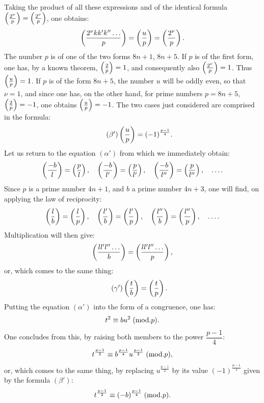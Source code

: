 \noindent
Taking the product of all these expressions and of the identical formula
$\left(\frac{2^\nu}{p}\right)=\left(\frac{2^\nu}{p}\right)$, one obtains:
\[
\left(\frac{2^\nu kk'k''\ldots}{p}\right)=\left(\frac{u}{p}\right)=\left(\frac{2^\nu}{p}\right).
\]
The number $p$ is of one of the two forms $8n+1$, $8n+5$. If $p$ is of the
first form, one has, by a known theorem, $\left(\frac{2}{p}\right)=1$, and consequently
also $\left(\frac{2^\nu}{p}\right)=1$. Thus $\left(\frac{u}{p}\right)=1$. If $p$ is of the form $8n+5$, the
number $u$ will be oddly even, so that $\nu=1$, and since one has, on the
other hand, for prime numbers $p=8n+5$, $\left(\frac{2}{p}\right)=-1$, one obtains
$\left(\frac{u}{p}\right)=-1$. The two cases just considered are comprised in
the formula:
\begin{equation*}\tag{$\beta'$}
\left(\frac{u}{p}\right)=(-1)^{\frac{p-1}{4}}.
\end{equation*}
Let us return to the equation $(\alpha')$ from which we immediately obtain:
\[
\left(\frac{-b}{l}\right)=\left(\frac{p}{l}\right),\quad\left(\frac{-b}{l'}\right)=\left(\frac{p}{l'}\right),\quad
\left(\frac{-b}{l''}\right)=\left(\frac{p}{l''}\right),\quad\ldots.
\]
Since $p$ is a prime number $4n+1$, and $b$ a prime number $4n+3$, one
will find, on applying the law of reciprocity:
\[
\left(\frac{l}{b}\right)=\left(\frac{l}{p}\right),\quad\left(\frac{l'}{b}\right)=\left(\frac{l'}{p}\right),\quad
\left(\frac{l''}{b}\right)=\left(\frac{l''}{p}\right),\quad\ldots.
\]
Multiplication will then give:
\[
\left(\frac{ll'l''\ldots}{b}\right)=\left(\frac{ll'l''\ldots}{p}\right),
\]
or, which comes to the same thing:
\begin{equation*}\tag{$\gamma'$}
\left(\frac{t}{b}\right)=\left(\frac{t}{p}\right).
\end{equation*}
Putting the equation $(\alpha')$ into the form of a congruence, one has:
\[
t^2\equiv bu^2\;(\mathrm{mod}.p).
\]
One concludes from this, by raising both members to the power $\dfrac{p-1}{4}$:
\[
t^{\frac{p-1}{2}}\equiv b^{\frac{p-1}{4}}u^{\frac{p-1}{2}}\;(\mathrm{mod}.p),
\]
or, which comes to the same thing, by replacing $u^{\frac{p-1}{2}}$ by its value $(-1)^{\frac{p-1}{4}}$ given
by the formula $(\beta')$:
\[
t^{\frac{p-1}{2}}\equiv(-b)^{\frac{p-1}{4}}\;(\mathrm{mod}.p).
\]
